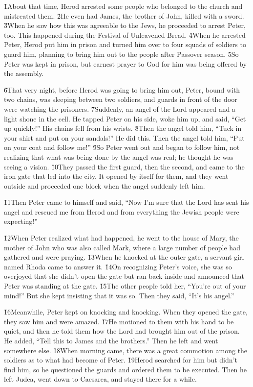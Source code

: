 \v{1}About that time, Herod arrested some people who belonged to the church and mistreated them. \v{2}He even had James, the brother of John, killed with a sword. \v{3}When he saw how this was agreeable to the Jews, he proceeded to arrest Peter, too. This happened during the Festival of Unleavened Bread. \v{4}When he arrested Peter, Herod put him in prison and turned him over to four squads of soldiers to guard him, planning to bring him out to the people after Passover season. \v{5}So Peter was kept in prison, but earnest prayer to God for him was being offered by the assembly.

\v{6}That very night, before Herod was going to bring him out, Peter, bound with two chains, was sleeping between two soldiers, and guards in front of the door were watching the prisoners. \v{7}Suddenly, an angel of the Lord appeared and a light shone in the cell. He tapped Peter on his side, woke him up, and said, ``Get up quickly!'' His chains fell from his wrists. \v{8}Then the angel told him, ``Tuck in your shirt and put on your sandals!'' He did this. Then the angel told him, ``Put on your coat and follow me!'' \v{9}So Peter went out and began to follow him, not realizing that what was being done by the angel was real; he thought he was seeing a vision. \v{10}They passed the first guard, then the second, and came to the iron gate that led into the city. It opened by itself for them, and they went outside and proceeded one block when the angel suddenly left him.

\v{11}Then Peter came to himself and said, ``Now I'm sure that the Lord has sent his angel and rescued me from Herod and from everything the Jewish people were expecting!''

\v{12}When Peter realized what had happened, he went to the house of Mary, the mother of John who was also called Mark, where a large number of people had gathered and were praying. \v{13}When he knocked at the outer gate, a servant girl named Rhoda came to answer it. \v{14}On recognizing Peter's voice, she was so overjoyed that she didn't open the gate but ran back inside and announced that Peter was standing at the gate. \v{15}The other people told her, ``You're out of your mind!'' But she kept insisting that it was so. Then they said, ``It's his angel.''

\v{16}Meanwhile, Peter kept on knocking and knocking. When they opened the gate, they saw him and were amazed. \v{17}He motioned to them with his hand to be quiet, and then he told them how the Lord had brought him out of the prison. He added, ``Tell this to James and the brothers.'' Then he left and went somewhere else. \v{18}When morning came, there was a great commotion among the soldiers as to what had become of Peter. \v{19}Herod searched for him but didn't find him, so he questioned the guards and ordered them to be executed. Then he left Judea, went down to Caesarea, and stayed there for a while.

